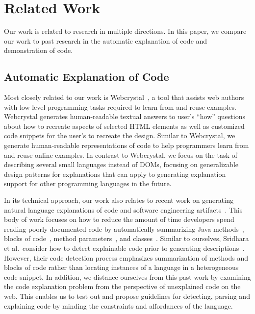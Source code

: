 \section{Related Work}

Our work is related to research in multiple directions.
In this paper, we compare our work to past research in the automatic explanation of code and demonstration of code.

\subsection{Automatic Explanation of Code}

Most closely related to our work is Webcrystal~\cite{chang_webcrystal_2012}, a tool that assists web authors with low-level programming tasks required to learn from and reuse examples.  
Webcrystal generates human-readable textual answers to user's ``how'' questions about how to recreate aspects of selected HTML elements as well as customized code snippets for the user's to recreate the design.
Similar to Webcrystal, we generate human-readable representations of code to help programmers learn from and reuse online examples.
In contrast to Webcrystal, we focus on the task of describing several small languages instead of DOMs, focusing on generalizable design patterns for explanations that can apply to generating explanation support for other programming languages in the future.

In its technical approach, our work also relates to recent work on generating natural language explanations of code and software engineering artifacts~\cite{sridhara_automatically_2011,burden_natural_2011,sridhara_towards_2010,kamimura_towards_2013,mcburney_automatic_2014,sridhara_generating_2011,haiduc_supporting_2010,moreno_automatic_2013}.
This body of work focuses on how to reduce the amount of time developers spend reading poorly-documented code by automatically summarizing Java methods~\cite{sridhara_towards_2010}, blocks of code~\cite{sridhara_automatically_2011}, method parameters~\cite{sridhara_generating_2011}, and classes~\cite{moreno_automatic_2013}.
Similar to ourselves, Sridhara et al.\ consider how to detect explainable code prior to generating descriptions~\cite{sridhara_automatically_2011,sridhara_towards_2010}.
However, their code detection process emphasizes summarization of methods and blocks of code rather than locating instances of a language in a heterogeneous code snippet.
In addition, we distance ourselves from this past work by examining the code explanation problem from the perspective of unexplained code on the web.
This enables us to test out and propose guidelines for detecting, parsing and explaining code by minding the constraints and affordances of the language.

